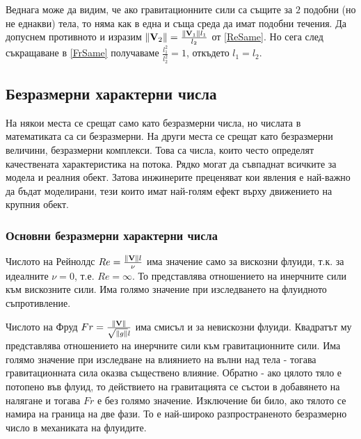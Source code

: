 Веднага може да видим, че ако гравитационните сили са същите за $2$ подобни (но не еднакви) тела, то няма как в една и съща среда да имат подобни течения.
Да допуснем противното и изразим $\norm{\mathbf{V}_2} = \frac{\norm{\mathbf{V}_1} l_1}{l_2}$ от \eqref{ReSame}.
Но сега след съкращаване в \eqref{FrSame} получаваме $\frac{l_1^2}{l_2^2} = 1$, откъдето $l_1 = l_2$.

\subsection{Безразмерни характерни числа}
На някои места се срещат само като безразмерни числа, но числата в математиката са си безразмерни.
На други места се срещат като безразмерни величини, безразмерни комплекси. 
Това са числа, които често определят качествената характеристика на потока.
Рядко могат да съвпаднат всичките за модела и реалния обект.
Затова инжинерите преценяват кои явления е най-важно да бъдат моделирани, тези които имат най-голям ефект върху движението на крупния обект.

\subsubsection{Основни безразмерни характерни числа}
Числото на Рейнолдс $Re = \frac{\norm{\mathbf{V}} l}{\nu}$ има значение само за вискозни флуиди, т.к. за идеалните $\nu = 0$, т.е. $Re = \infty$.
То представлява отношението на инерчните сили към вискозните сили.
Има голямо значение при изследването на флуидното съпротивление.

Числото на Фруд $Fr = \frac{\norm{\mathbf{V}}}{\sqrt{\norm{g}} l}$ има смисъл и за невискозни флуиди.
Квадратът му представлява отношението на инерчните сили към гравитационните сили. 
Има голямо значение при изследване на влиянието на вълни над тела - тогава гравитационната сила оказва съществено влияние.
Обратно - ако цялото тяло е потопено във флуид, то действието на гравитацията се състои в добавянето на налягане и тогава $Fr$ е без голямо значение.
Изключение би било, ако тялото се намира на граница на две фази.
То е най-широко разпространеното безразмерно число в механиката на флуидите.

